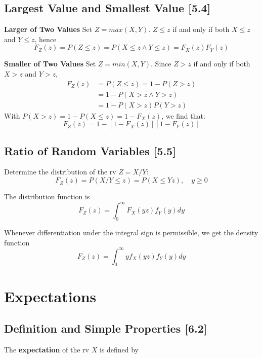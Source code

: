 \documentclass[a4paper,9pt]{extarticle}
\begin{document}
\begin{multicols*}{2}
\subsection{Largest Value and Smallest Value [5.4]}
\textbf{Larger of Two Values}
Set $Z = max(X, Y)$. $Z \leq z$ if and only if both $X \leq z$ and $Y \leq z$, hence
\begin{equation}
    F_Z(z) = P(Z \leq z) = P(X \leq z \wedge Y \leq z) = F_X(z) F_Y(z)
\end{equation}

\textbf{Smaller of Two Values}
Set $Z = min(X, Y)$. Since $Z > z$ if and only if both $X > z$ and $Y > z$,
\begin{equation}
    \begin{split}
        F_Z(z) & = P(Z \leq z) = 1 - P(Z > z) \\
        & = 1 - P(X > z \wedge Y > z) \\
        & = 1 - P(X > z) P(Y > z)
    \end{split}
\end{equation}
With $P(X > z) = 1 - P(X \leq z) = 1 - F_X(z)$, we find that:
\begin{equation}
    F_Z(z) = 1 - [1 - F_X(z)][1 - F_Y(z)]
\end{equation}

\subsection{Ratio of Random Variables [5.5]}
Determine the distribution of the rv $Z = X/Y$:
\begin{equation}
    F_Z(z) = P(X/Y \leq z) = P(X \leq Yz), \quad y \geq 0
\end{equation}

The distribution function is
\begin{equation}
    F_Z(z) = \int_0^{\infty} F_X(yz) f_Y(y) dy
\end{equation}

Whenever differentiation under the integral sign is permissible, we get the density function
\begin{equation}
    F_Z(z) = \int_0^{\infty} y f_X(yz) f_Y(y) dy
\end{equation}

\section{Expectations}
\subsection{Definition and Simple Properties [6.2]}
The \textbf{expectation} of the rv $X$ is defined by


\end{multicols*}
\end{document}
